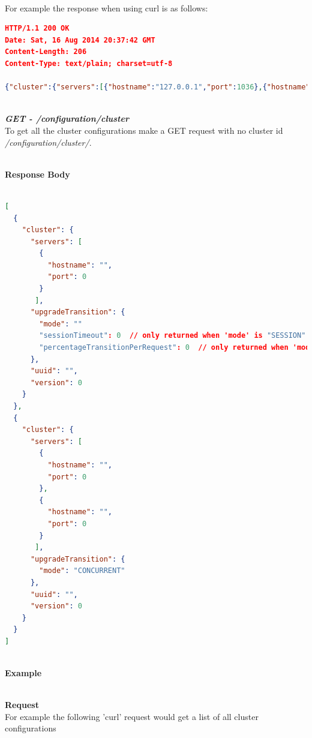 \documentclass[a4paper,11pt,twoside]{article}
\begin{document}
\noindent \\
For example the response when using curl is as follows:

\begin{lstlisting}[language=json,firstnumber=1]
HTTP/1.1 200 OK
Date: Sat, 16 Aug 2014 20:37:42 GMT
Content-Length: 206
Content-Type: text/plain; charset=utf-8

{"cluster":{"servers":[{"hostname":"127.0.0.1","port":1036},{"hostname":"127.0.0.1","port":1038}],"upgradeTransition":{"mode":"SESSION","sessionTimeout":60},"uuid":"016ca2cd-2585-11e4-ab5c-600308a8245e","version":1.1}}
\end{lstlisting}

\noindent \\
\textit{\textbf{GET - /configuration/cluster}}\\
\noindent 
To get all the cluster configurations make a GET request with no cluster id \textit{/configuration/cluster/}.

\noindent \\
\textbf{Response Body}\\

\begin{lstlisting}[language=json,firstnumber=1]

[
  {
    "cluster": {
      "servers": [
        {
          "hostname": "",
          "port": 0
        }
       ],
      "upgradeTransition": {
        "mode": ""
        "sessionTimeout": 0  // only returned when 'mode' is "SESSION" 
        "percentageTransitionPerRequest": 0  // only returned when 'mode' is "GRADUAL"
      },
      "uuid": "",
      "version": 0
    }
  },
  {
    "cluster": {
      "servers": [
        {
          "hostname": "",
          "port": 0
        },
        {
          "hostname": "",
          "port": 0
        }
       ],
      "upgradeTransition": {
        "mode": "CONCURRENT"
      },
      "uuid": "",
      "version": 0
    }
  }
]
\end{lstlisting}

\noindent \\
\textbf{Example}

\noindent \\
\textbf{Request}\\

\noindent 
For example the following 'curl' request would get a list of all cluster configurations\\
\end{document}
